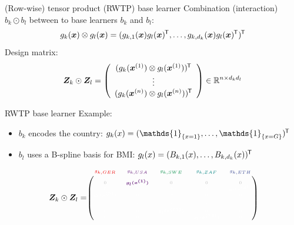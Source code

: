\documentclass[t,10pt]{beamer}
\begin{document}
\begin{frame}{(Row-wise) tensor product (RWTP) base learner}
  Combination (interaction) $b_k \odot b_l$ between to base learners $b_k$ and $b_l$:
  \[g_k(\xv) \otimes g_l(\xv) = (g_{k,1}(\xv)g_l(\xv)^\tran, \dots, g_{k,d_k}(\xv)g_l(\xv)^\tran)^\tran \]
  Design matrix:
  \[
  \design_k \odot \design_l = \left(\begin{array}{c}
    (g_{k}(\xi[1]) \otimes g_l(\xi[1]))^\tran \\
    \vdots \\
    (g_{k}(\xi[n]) \otimes g_l(\xi[n]))^\tran
  \end{array}\right) \in\R^{n\times d_k d_l}
  \]
\end{frame}





\begin{frame}{RWTP base learner}
  Example:
  \begin{itemize}
    \item $b_k$ encodes the country: $g_k(x) = (\mathds{1}_{\{x = 1\}}, \dots, \mathds{1}_{\{x = G\}})^\tran$
    \item $b_l$ uses a B-spline basis for BMI: $g_l(x) = (B_{k,1}(x), \dots, B_{k,d_k}(x))^\tran$
  \end{itemize}
  $$
    \design_k \odot \design_l = \tiny\begin{blockarray}{ccccc}
      \color[HTML]{EE0000}g_{k,GER} & \color[HTML]{631879}g_{k,USA} & \color[HTML]{008B45}g_{k,SWE} & \color[HTML]{008280}g_{k,ZAF} & \color[HTML]{3B4992}g_{k,ETH}\\
    \begin{block}{(ccccc)}
      \phantom{x}\\
      \color{lightgray}0 & \color[HTML]{631879}\bm{g_l(x^{(1)})} & \color{lightgray}0 & \color{lightgray}0 & \color{lightgray}0 \\
      \color{white}0 & \color{white}0 & \color{white}0 & \color{white}0 & \color{white}\bm{g_l(x^{(2)})} \\
      \color{white}\bm{g_l(x^{(3)})} & \color{white}0 & \color{white}0 & \color{white}0 & \color{white}0 \\
      \color{white}\vdots & \color{white}\vdots & \color{white}\vdots & \color{white}\vdots & \color{white}\vdots \\
      \color{white}0 & \color{white}0 & \color{white}\bm{g_l(x^{(73)})} & \color{white}0 & \color{white}0 \\
      \color{white}0 & \color{white}0 & \color{white}0 & \color{white}\bm{g_l(x^{(74)})} & \color{white}0 \\

\end{block}
\end{blockarray}$$
\end{frame}
\end{document}
